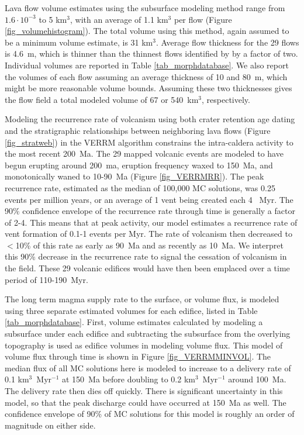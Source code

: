 \documentclass[12pt,letter]{article}
\begin{document}
Lava flow volume estimates using the subsurface modeling method range from $1.6\cdot 10^{-3}$ to 5 km$^3$, with an average of 1.1 km$^3$ per flow (Figure \ref{fig_volumehistogram}). The total volume using this method, again assumed to be a minimum volume estimate, is 31 km$^3$. Average flow thickness for the 29 flows is 4.6~m, which is thinner than the thinnest flows identified by \citet{mouginis2008lava} by a factor of two. Individual volumes are reported in Table \ref{tab_morphdatabase}. We also report the volumes of each flow assuming an average thickness of 10 and 80~m, which might be more reasonable volume bounds. Assuming these two thicknesses gives the flow field a total modeled volume of 67 or 540~km$^3$, respectively.

Modeling the recurrence rate of volcanism using both crater retention age dating and the stratigraphic relationships between neighboring lava flows (Figure \ref{fig_stratweb}) in the VERRM algorithm constrains the intra-caldera activity to the most recent 200~Ma. The 29 mapped volcanic events are modeled to have begun erupting around 200~ma, eruption frequency waxed to 150~Ma, and monotonically waned to 10-90~Ma (Figure \ref{fig_VERRMRR}). The peak recurrence rate, estimated as the median of 100,000 MC solutions, was 0.25 events per million years, or an average of 1 vent being created each 4 ~Myr. The 90\% confidence envelope of the recurrence rate through time is generally a factor of 2-4. This means that at peak activity, our model estimates a recurrence rate of vent formation of 0.1-1 events per Myr. The rate of volcanism then decreased to $<$10\% of this rate as early as 90~Ma and  as recently as 10~Ma. We interpret this 90\% decrease in the recurrence rate to signal the cessation of volcanism in the field. These 29 volcanic edifices would have then been emplaced over a time period of 110-190~Myr.

The long term magma supply rate to the surface, or volume flux, is modeled using three separate estimated volumes for each edifice, listed in Table \ref{tab_morphdatabase}. First, volume estimates calculated by modeling a subsurface under each edifice and subtracting the subsurface from the overlying topography is used as edifice volumes in modeling volume flux. This model of volume flux through time is shown in Figure \ref{fig_VERRMMINVOL}. The median flux of all MC solutions here is modeled to increase to a delivery rate of 0.1 km$^3$~Myr$^{-1}$ at 150~Ma before doubling to 0.2 km$^3$~Myr$^{-1}$ around 100~Ma. The delivery rate then dies off quickly. There is significant uncertainty in this model, so that the peak discharge could have occurred at 150~Ma as well. The confidence envelope of 90\% of MC solutions for this model is roughly an order of magnitude on either side.
\end{document}
